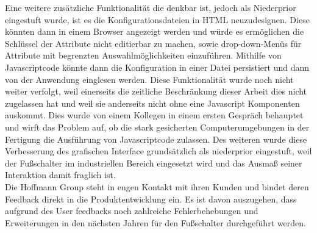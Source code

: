 Eine weitere zusätzliche Funktionalität die denkbar ist, jedoch als Niederprior eingestuft wurde, ist es die Konfigurationsdateien in \ac{HTML} neuzudesignen. Diese könnten dann in einem Browser angezeigt werden und würde es ermöglichen die Schlüssel der Attribute nicht editierbar zu machen, sowie drop-down-Menüs für Attribute mit begrenzten Auswahlmöglichkeiten einzuführen. Mithilfe von Javascriptcode könnte dann die Konfiguration in einer Datei persistiert und dann von der Anwendung einglesen werden. Diese Funktionalität wurde noch nicht weiter verfolgt, weil einerseits die zeitliche Beschränkung dieser Arbeit dies nicht zugelassen hat und weil sie anderseits nicht ohne eine Javascript Komponenten auskommt. Dies wurde von einem Kollegen in einem ersten Gespräch behauptet und wirft das Problem auf, ob die stark gesicherten Computerumgebungen in der Fertigung die Ausführung von Javascriptcode zulassen. Des weiteren wurde diese Verbesserung des grafischen Interface grundsätzlich als niederprior eingestuft, weil der Fußschalter im industriellen Bereich eingesetzt wird und das Ausmaß seiner Interaktion damit fraglich ist.\\
Die Hoffmann Group steht in engen Kontakt mit ihren Kunden und bindet deren Feedback direkt in die Produktentwicklung ein. Es ist davon auszugehen, dass aufgrund des User feedbacks noch zahlreiche Fehlerbehebungen und Erweiterungen in den nächsten Jahren für den Fußschalter durchgeführt werden.